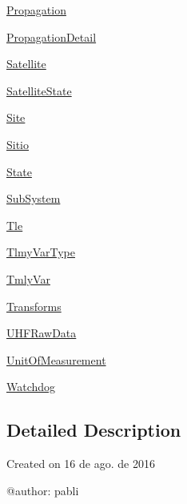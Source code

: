 \begin{DoxyCompactItemize}
 \hyperlink{namespace_ground_segment_1_1models_1_1_propagation}{Propagation}
\item 
 \hyperlink{namespace_ground_segment_1_1models_1_1_propagation_detail}{Propagation\+Detail}
\item 
 \hyperlink{namespace_ground_segment_1_1models_1_1_satellite}{Satellite}
\item 
 \hyperlink{namespace_ground_segment_1_1models_1_1_satellite_state}{Satellite\+State}
\item 
 \hyperlink{namespace_ground_segment_1_1models_1_1_site}{Site}
\item 
 \hyperlink{namespace_ground_segment_1_1models_1_1_sitio}{Sitio}
\item 
 \hyperlink{namespace_ground_segment_1_1models_1_1_state}{State}
\item 
 \hyperlink{namespace_ground_segment_1_1models_1_1_sub_system}{Sub\+System}
\item 
 \hyperlink{namespace_ground_segment_1_1models_1_1_tle}{Tle}
\item 
 \hyperlink{namespace_ground_segment_1_1models_1_1_tlmy_var_type}{Tlmy\+Var\+Type}
\item 
 \hyperlink{namespace_ground_segment_1_1models_1_1_tmly_var}{Tmly\+Var}
\item 
 \hyperlink{namespace_ground_segment_1_1models_1_1_transforms}{Transforms}
\item 
 \hyperlink{namespace_ground_segment_1_1models_1_1_u_h_f_raw_data}{U\+H\+F\+Raw\+Data}
\item 
 \hyperlink{namespace_ground_segment_1_1models_1_1_unit_of_measurement}{Unit\+Of\+Measurement}
\item 
 \hyperlink{namespace_ground_segment_1_1models_1_1_watchdog}{Watchdog}
\end{DoxyCompactItemize}


\subsection{Detailed Description}
\begin{DoxyVerb}Created on 16 de ago. de 2016

@author: pabli
\end{DoxyVerb}
 